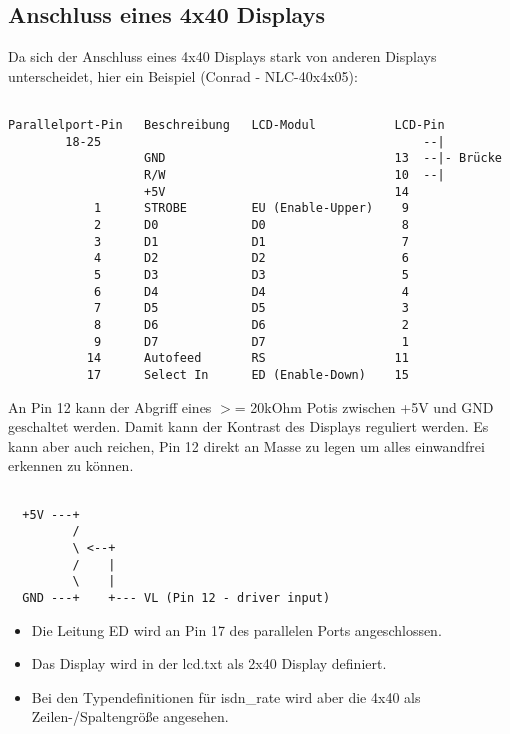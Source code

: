 \subsection{Anschluss eines 4x40 Displays}

  Da sich der Anschluss eines 4x40 Displays stark von anderen Displays
  unterscheidet, hier ein Beispiel (Conrad - NLC-40x4x05):

\begin{example}
\begin{verbatim}

Parallelport-Pin   Beschreibung   LCD-Modul           LCD-Pin
        18-25                                             --|
                   GND                                13  --|- Brücke
                   R/W                                10  --|
                   +5V                                14
            1      STROBE         EU (Enable-Upper)    9
            2      D0             D0                   8
            3      D1             D1                   7
            4      D2             D2                   6
            5      D3             D3                   5
            6      D4             D4                   4
            7      D5             D5                   3
            8      D6             D6                   2
            9      D7             D7                   1
           14      Autofeed       RS                  11
           17      Select In      ED (Enable-Down)    15
\end{verbatim}
\end{example}


  An Pin 12 kann der Abgriff eines $>$= 20kOhm Potis zwischen +5V und GND 
  geschaltet werden. Damit kann der Kontrast des Displays reguliert werden.
  Es kann aber auch reichen, Pin 12 direkt an Masse zu legen um alles
  einwandfrei erkennen zu können.

\begin{example}
\begin{verbatim}

  +5V ---+
         /
         \ <--+
         /    |
         \    |
  GND ---+    +--- VL (Pin 12 - driver input)
\end{verbatim}
\end{example}


  \begin{itemize}
  \item Die Leitung ED wird an Pin 17 des parallelen Ports angeschlossen.
  
  \item Das Display wird in der lcd.txt als 2x40 Display definiert.
  
  \item Bei den Typendefinitionen für isdn\_rate wird aber die 4x40 als
    Zeilen-/Spaltengröße angesehen.
  \end{itemize}


